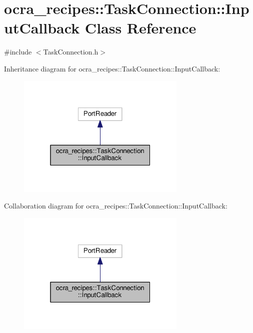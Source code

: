 \hypertarget{classocra__recipes_1_1TaskConnection_1_1InputCallback}{}\section{ocra\+\_\+recipes\+:\+:Task\+Connection\+:\+:Input\+Callback Class Reference}
\label{classocra__recipes_1_1TaskConnection_1_1InputCallback}


{\ttfamily \#include $<$Task\+Connection.\+h$>$}



Inheritance diagram for ocra\+\_\+recipes\+:\+:Task\+Connection\+:\+:Input\+Callback\+:
\nopagebreak
\begin{figure}[H]
\begin{center}
\leavevmode
\includegraphics[width=229pt]{d2/db7/classocra__recipes_1_1TaskConnection_1_1InputCallback__inherit__graph}
\end{center}
\end{figure}


Collaboration diagram for ocra\+\_\+recipes\+:\+:Task\+Connection\+:\+:Input\+Callback\+:
\nopagebreak
\begin{figure}[H]
\begin{center}
\leavevmode
\includegraphics[width=229pt]{d9/d21/classocra__recipes_1_1TaskConnection_1_1InputCallback__coll__graph}
\end{center}
\end{figure}
